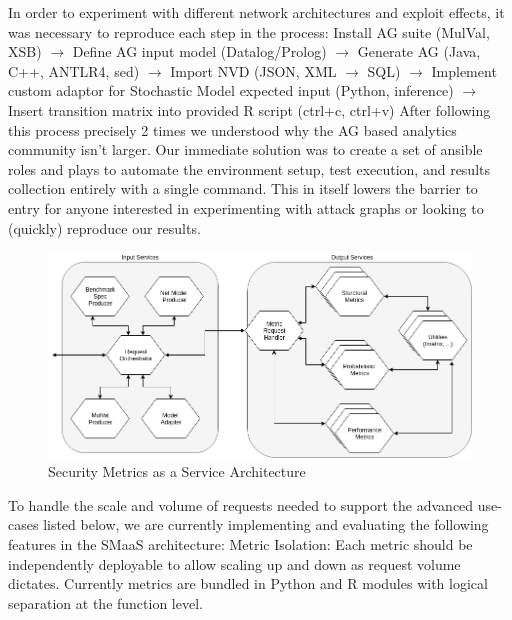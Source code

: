 
In order to experiment with different network architectures and exploit effects, it was necessary to reproduce each step in the process: 
Install AG suite (MulVal, XSB) $\rightarrow$ Define AG input model (Datalog/Prolog) $\rightarrow$ Generate AG (Java, C++, ANTLR4, sed) $\rightarrow$ Import NVD (JSON, XML $\rightarrow$ SQL) $\rightarrow$ Implement custom adaptor for Stochastic Model expected input (Python, inference) $\rightarrow$ Insert transition matrix into provided R script (ctrl+c, ctrl+v) 
After following this process precisely 2 times we understood why the AG based analytics community isn’t larger. Our immediate solution was to create a set of ansible roles and plays to automate the environment setup, test execution, and results collection entirely with a single command. This in itself lowers the barrier to entry for anyone interested in experimenting with attack graphs or looking to (quickly) reproduce our results.

\begin{figure}[ht]
\centering
\includegraphics[width=.9\textwidth]{resource/img/ch_current/smaas/smaas_arch.png}
\caption{Security Metrics as a Service Architecture}
\label{fig:smaas:smaas_arch}
\end{figure} 


To handle the scale and volume of requests needed to support the advanced use-cases listed below, we are currently implementing and evaluating the following features in the SMaaS architecture:
Metric Isolation: Each metric should be independently deployable to allow scaling up and down as request volume dictates. Currently metrics are bundled in Python and R modules with logical separation at the function level.




